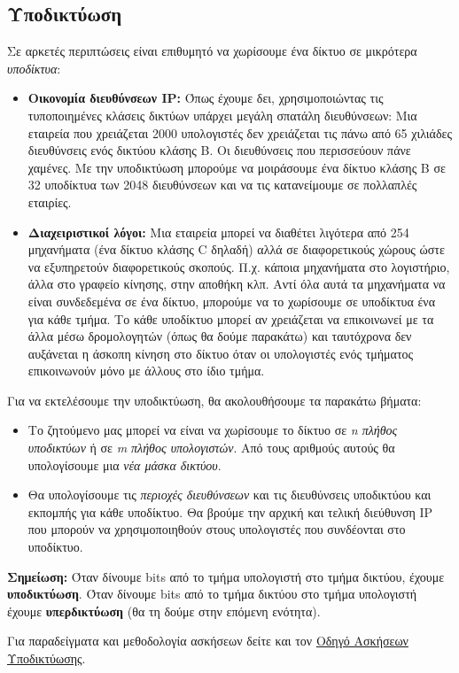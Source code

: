 %
%
\subsection{Υποδικτύωση}
Σε αρκετές περιπτώσεις είναι επιθυμητό να χωρίσουμε ένα δίκτυο σε μικρότερα \emph{υποδίκτυα}:

\begin{itemize}
\item \textbf{Οικονομία διευθύνσεων IP:} Όπως έχουμε δει, χρησιμοποιώντας τις τυποποιημένες κλάσεις δικτύων υπάρχει μεγάλη σπατάλη διευθύνσεων: Μια εταιρεία που χρειάζεται 2000 υπολογιστές δεν χρειάζεται τις πάνω από 65 χιλιάδες διευθύνσεις ενός δικτύου κλάσης Β. Οι διευθύνσεις που περισσεύουν πάνε χαμένες. Με την υποδικτύωση μπορούμε να μοιράσουμε ένα δίκτυο κλάσης Β σε 32 υποδίκτυα των 2048 διευθύνσεων και να τις κατανείμουμε σε πολλαπλές εταιρίες.
\item \textbf{Διαχειριστικοί λόγοι:} Μια εταιρεία μπορεί να διαθέτει λιγότερα από 254 μηχανήματα (ένα δίκτυο κλάσης C δηλαδή) αλλά σε διαφορετικούς χώρους ώστε να εξυπηρετούν διαφορετικούς σκοπούς. Π.χ. κάποια μηχανήματα στο λογιστήριο, άλλα στο γραφείο κίνησης, στην αποθήκη κλπ. Αντί όλα αυτά τα μηχανήματα να είναι συνδεδεμένα σε ένα δίκτυο, μπορούμε να το χωρίσουμε σε υποδίκτυα ένα για κάθε τμήμα. Το κάθε υποδίκτυο μπορεί αν χρειάζεται να επικοινωνεί με τα άλλα μέσω δρομολογητών (όπως θα δούμε παρακάτω) και ταυτόχρονα δεν αυξάνεται η άσκοπη κίνηση στο δίκτυο όταν οι υπολογιστές ενός τμήματος επικοινωνούν μόνο με άλλους στο ίδιο τμήμα.
\end{itemize}

Για να εκτελέσουμε την υποδικτύωση, θα ακολουθήσουμε τα παρακάτω βήματα:

\begin{itemize}
\item Το ζητούμενο μας μπορεί να είναι να χωρίσουμε το δίκτυο σε \emph{n πλήθος υποδικτύων} ή σε \emph{m πλήθος υπολογιστών}. Από τους αριθμούς αυτούς θα υπολογίσουμε μια \emph{νέα μάσκα δικτύου}.
\item Θα υπολογίσουμε τις \emph{περιοχές διευθύνσεων} και τις διευθύνσεις υποδικτύου και εκπομπής για κάθε υποδίκτυο. Θα βρούμε την αρχική και τελική διεύθυνση IP που μπορούν να χρησιμοποιηθούν στους υπολογιστές που συνδέονται στο υποδίκτυο.
\end{itemize}

\begin{inthebox}
\textbf{Σημείωση:} Όταν δίνουμε bits από το τμήμα υπολογιστή στο τμήμα δικτύου, έχουμε \textbf{υποδικτύωση}. Όταν δίνουμε bits από το τμήμα δικτύου στο τμήμα υπολογιστή έχουμε \textbf{υπερδικτύωση} (θα τη δούμε στην επόμενη ενότητα).

Για παραδείγματα και μεθοδολογία ασκήσεων δείτε και τον  \href{http://www.freebsdworld.gr/diktia/subnetting-guide.pdf}{Οδηγό Ασκήσεων Υποδικτύωσης}.\\
\end{inthebox}

